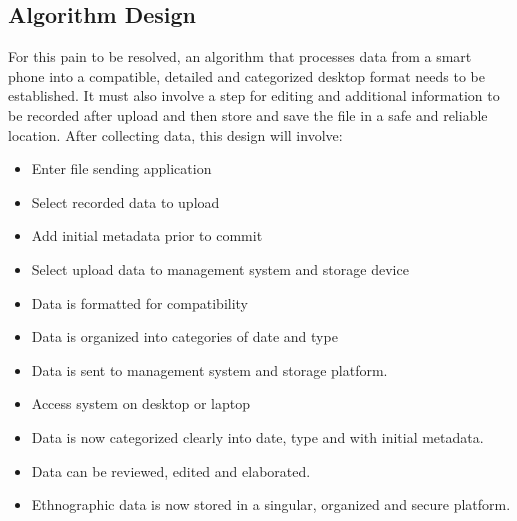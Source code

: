 \documentclass{article}
\begin{document}
\subsection{Algorithm Design}
For this pain to be resolved, an algorithm that processes data from a smart phone into a compatible, detailed and categorized desktop format needs to be established. It must also involve a step for editing and additional information to be recorded after upload and then store and save the file in a safe and reliable location. After collecting data, this design will involve:
\begin{itemize}
\item Enter file sending application
\item Select recorded data to upload
\item Add initial metadata prior to commit 
\item Select upload data to management system and storage device 
\item Data is formatted for compatibility 
\item Data is organized into categories of date and type
\item Data is sent to management system and storage platform.
\item Access system on desktop or laptop
\item Data is now categorized clearly into date, type and with initial metadata.
\item Data can be reviewed, edited and elaborated.
\item Ethnographic data is now stored in a singular, organized and secure platform.
\end{itemize}
\end{document}
